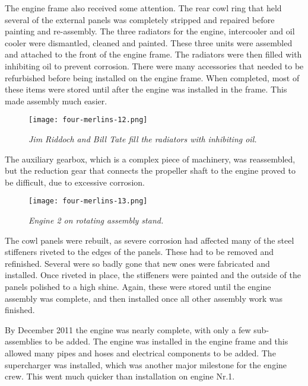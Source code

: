 The engine frame also received some attention.  The rear cowl ring that held
several of the external panels was completely stripped and repaired before
painting and re-assembly. The three radiators for the engine, intercooler and
oil cooler were dismantled, cleaned and painted.  These three units were
assembled and attached to the front of the engine frame.  The radiators were
then filled with inhibiting oil to prevent corrosion.  There were many
accessories that needed to be refurbished before being installed on the engine
frame.  When completed, most of these items were stored until after the engine
was installed in the frame.  This made assembly much easier.

\begin{figure}[htbp]
   \vspace{2em}
   \centering
   \texttt{[image: four-merlins-12.png]}
   \caption*{\small \em Jim Riddoch and Bill Tate fill the radiators with
inhibiting oil.}
   \label{fig:tim}
\end{figure}

The auxiliary gearbox, which is a complex piece of machinery, was reassembled,
but the reduction gear that connects the propeller shaft to the engine proved
to be difficult, due to excessive corrosion.

\begin{figure}[htbp]
   \vspace{2em}
   \centering
   \texttt{[image: four-merlins-13.png]}
   \caption*{\small \em Engine 2 on rotating assembly stand.}
   \label{fig:tim}
\end{figure}

The cowl panels were rebuilt, as severe corrosion had affected many of the
steel stiffeners riveted to the edges of the panels.  These had to be removed
and refinished.  Several were so badly gone that new ones were fabricated and
installed.  Once riveted in place, the stiffeners were painted and the outside
of the panels polished to a high shine.  Again, these were stored until the
engine assembly was complete, and then installed once all other assembly work
was finished.

By December 2011 the engine was nearly complete, with only a few sub-assemblies
to be added.  The engine was installed in the engine frame and this allowed
many pipes and hoses and electrical components to be added.  The supercharger
was installed, which was another major milestone for the engine crew.  This
went much quicker than installation on engine  Nr.1.  

